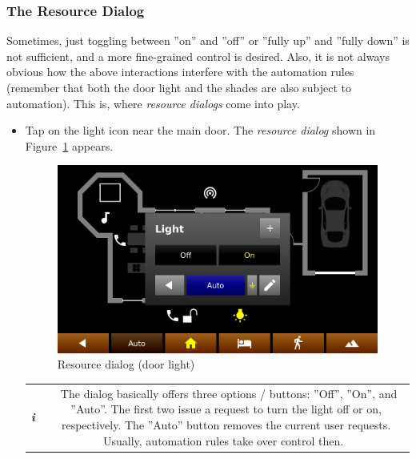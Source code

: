 \documentclass[12pt,english,parskip=half,headheight=19pt]{scrreprt}
\newcommand{\infobox}[1]{
  \par
  \medskip
  \hfill
  \setlength\arrayrulewidth{1pt}
  \begin{tabular}[t]{c|c|}
    \parbox{1.8em}{\hfill\textit{\Huge\textbf{i}\,}}
    &
    \,\parbox{0.89\linewidth}{\setlength{\parskip}{0.5em} \small #1}\,
  \end{tabular}
  \medskip
  \par
}
\begin{document}
\subsubsection{The Resource Dialog}

Sometimes, just toggling between ''on'' and ''off'' or ''fully up'' and ''fully down'' is not sufficient,
and a more fine-grained control is desired.
Also, it is not always obvious how the above interactions interfere with the automation rules (remember that
both the door light and the shades are also subject to automation). This is, where \textit{resource dialogs} come into play.

\begin{itemize}[$\blacktriangleright$]

  \item
    Tap on the light icon near the main door. The \textit{resource dialog} shown in
    Figure~\ref{fig:tutorial-floorplan-light} appears.

    \begin{figure}[ht]
      \centering
      \includegraphics[width=0.65\linewidth]{figs/wallclock-floorplan-light.png}
      \caption[l]{Resource dialog (door light)}
      \label{fig:tutorial-floorplan-light}
    \end{figure}

    \infobox{
      The dialog basically offers three options / buttons: ''Off'', ''On'', and ''Auto''.
      The first two issue a request to turn the light off or on, respectively. The ''Auto'' button
      removes the current user requests. Usually, automation rules take over control then.
    }


\end{itemize}
\end{document}
